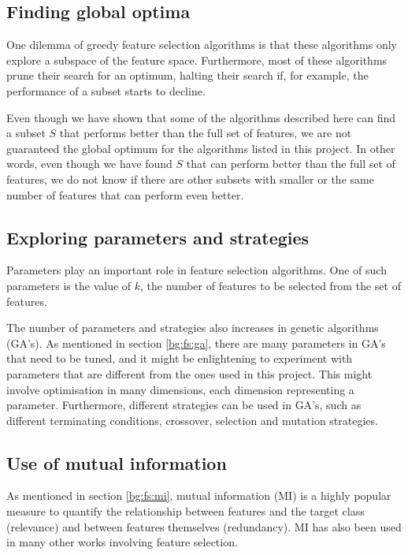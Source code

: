 \documentclass[12pt, twoside, a4paper]{report}
\begin{document}
\subsection{Finding global optima}

One dilemma of greedy feature selection algorithms is that these algorithms only explore a subspace of the feature space. Furthermore, most of these algorithms prune their search for an optimum, halting their search if, for example, the performance of a subset starts to decline.

Even though we have shown that some of the algorithms described here can find a subset $S$ that performs better than the full set of features, we are not guaranteed the global optimum for the algorithms listed in this project. In other words, even though we have found $S$ that can perform better than the full set of features, we do not know if there are other subsets with smaller or the same number of features that can perform even better.

 

\subsection{Exploring parameters and strategies}

Parameters play an important role in feature selection algorithms. One of such parameters is the value of $k$, the number of features to be selected from the set of features.

The number of parameters and strategies also increases in genetic algorithms (GA's). As mentioned in section \ref{bg:fs:ga}, there are many parameters in GA's that need to be tuned, and it might be enlightening to experiment with parameters that are different from the ones used in this project. This might involve optimisation in many dimensions, each dimension representing a parameter. Furthermore, different strategies can be used in GA's, such as different terminating conditions, crossover, selection and mutation strategies.


\subsection{Use of mutual information}
As mentioned in section \ref{bg:fs:mi}, mutual information (MI) is a highly popular measure to quantify the relationship between features and the target class (relevance) and between features themselves (redundancy). MI has also been used in many other works involving feature selection.
\end{document}
